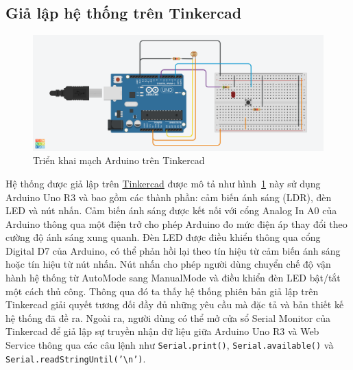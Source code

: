 {\subsection{Giả lập hệ thống trên Tinkercad }
\begin{figure}[H]
    \centering
    \includegraphics[width=1\linewidth]{img/Tinkercad.png}
    \caption{Triển khai mạch Arduino trên Tinkercad}
    \label{fig:tinkercad}
\end{figure}

Hệ thống được giả lập trên \href{https://www.tinkercad.com/}{Tinkercad} được mô tả như hình~\ref{fig:tinkercad} này sử dụng Arduino Uno R3 và bao gồm các thành phần: cảm biến ánh sáng (LDR), đèn LED và nút nhấn. Cảm biến ánh sáng được kết nối với cổng Analog In A0 của Arduino thông qua một điện trở cho phép Arduino đo mức điện áp thay đổi theo cường độ ánh sáng xung quanh. Đèn LED được điều khiển thông qua cổng Digital D7 của Arduino, có thể phản hồi lại theo tín hiệu từ cảm biến ánh sáng hoặc tín hiệu từ nút nhấn. Nút nhấn cho phép người dùng chuyển chế độ vận hành hệ thống từ AutoMode sang ManualMode và điều khiển đèn LED bật/tắt một cách thủ công. Thông qua đó ta thấy hệ thống phiên bản giả lập trên Tinkercad giải quyết tương đối đầy đủ những yêu cầu mà đặc tả và bản thiết kế hệ thống đã đề ra. Ngoài ra, người dùng có thể mở cửa sổ Serial Monitor của Tinkercad để giả lập sự truyền nhận dữ liệu giữa Arduino Uno R3 và Web Service thông qua các câu lệnh như \texttt{Serial.print()}, \texttt{Serial.available()} và \texttt{Serial.readStringUntil('\textbackslash n')}. 


\pagebreak
}
